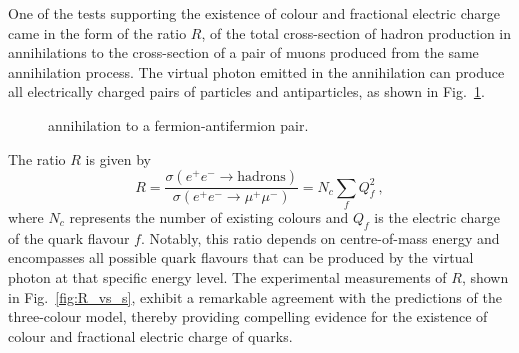 One of the tests supporting the existence of colour and fractional electric charge came in the form of the ratio $R$, of the total cross-section of hadron production in \ee annihilations to the cross-section of a pair of muons produced from the same annihilation process. The virtual photon emitted in the annihilation can produce all electrically charged pairs of particles and antiparticles, as shown in Fig.~\ref{fig:ee_to_ff_diagram}.

\begin{figure}[htb]
  \centering
\caption{\ee annihilation to a fermion-antifermion pair.}
  \label{fig:ee_to_ff_diagram}
\end{figure}

The ratio $R$ is given by
\begin{equation*}
    R = \frac{\sigma(e^+e^- \rightarrow \mathrm{hadrons})}{\sigma(e^+e^- \rightarrow \mu^+\mu^-)} = N_c \sum_f Q_f^2\ ,
\end{equation*}
where $N_c$ represents the number of existing colours and $Q_f$ is the electric charge of the quark flavour $f$. Notably, this ratio depends on centre-of-mass energy and encompasses all possible quark flavours that can be produced by the virtual photon at that specific energy level. The experimental measurements of $R$, shown in Fig.~\ref{fig:R_vs_s}, exhibit a remarkable agreement with the predictions of the three-colour model, thereby providing compelling evidence for the existence of colour and fractional electric charge of quarks.

